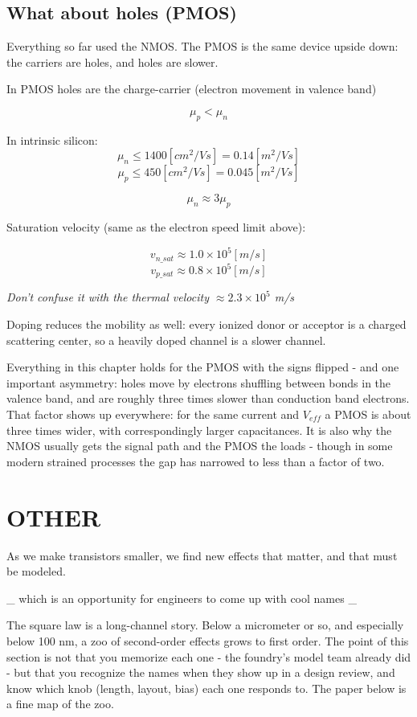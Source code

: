 \subsection{What about holes (PMOS)}\label{what-about-holes-pmos}

Everything so far used the NMOS. The PMOS is the same device upside
down: the carriers are holes, and holes are slower.

In PMOS holes are the charge-carrier (electron movement in valence band)

\[ \mu_p < \mu_n \]

In intrinsic silicon: \[ \mu_n  \leq 1400 [cm^2/Vs] = 0.14 [m^2/Vs] \]
\[ \mu_p  \leq 450 [cm^2/Vs] = 0.045 [m^2/Vs] \]

\[ \mu_n \approx 3\mu_p \]

Saturation velocity (same as the electron speed limit above):

\[ v_{n\_sat} \approx 1.0 \times 10^5 [m/s] \]
\[ v_{p\_sat} \approx 0.8 \times 10^5 [m/s] \]

\emph{Don't confuse it with the thermal velocity
\(\approx 2.3 \times 10^5\) m/s}

Doping reduces the mobility as well: every ionized donor or acceptor is
a charged scattering center, so a heavily doped channel is a slower
channel.

Everything in this chapter holds for the PMOS with the signs flipped -
and one important asymmetry: holes move by electrons shuffling between
bonds in the valence band, and are roughly three times slower than
conduction band electrons. That factor shows up everywhere: for the same
current and \(V_{eff}\) a PMOS is about three times wider, with
correspondingly larger capacitances. It is also why the NMOS usually
gets the signal path and the PMOS the loads - though in some modern
strained processes the gap has narrowed to less than a factor of two.

\section{OTHER}\label{other}

As we make transistors smaller, we find new effects that matter, and
that must be modeled.

\_ which is an opportunity for engineers to come up with cool names \_

The square law is a long-channel story. Below a micrometer or so, and
especially below 100 nm, a zoo of second-order effects grows to first
order. The point of this section is not that you memorize each one - the
foundry's model team already did - but that you recognize the names when
they show up in a design review, and know which knob (length, layout,
bias) each one responds to. The paper below is a fine map of the zoo.

